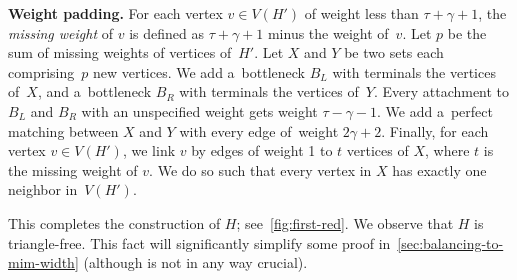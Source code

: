 \documentclass[a4paper,UKenglish,cleveref,hyperref,autoref]{lipics-v2021}
\begin{document}
\medskip

\textbf{Weight padding.}
For each vertex $v \in V(H')$ of weight less than $\tau + \gamma + 1$, the \emph{missing weight} of $v$ is defined as $\tau + \gamma + 1$ minus the weight of~$v$.
Let $p$ be the sum of missing weights of vertices of~$H'$.
Let $X$ and $Y$ be two sets each comprising~$p$ new vertices.
We add a~bottleneck $B_L$ with terminals the vertices of~$X$, and a~bottleneck $B_R$ with terminals the vertices of~$Y$.
Every attachment to $B_L$ and $B_R$ with an unspecified weight gets weight $\tau - \gamma - 1$.
We add a~perfect matching between $X$ and $Y$ with every edge of~weight $2 \gamma + 2$.
Finally, for each vertex $v \in V(H')$, we link $v$ by edges of weight 1 to $t$ vertices of $X$, where $t$ is the missing weight of $v$.
We do so such that every vertex in $X$ has exactly one neighbor in~$V(H')$.

This completes the construction of $H$; see~\cref{fig:first-red}.
We observe that $H$ is triangle-free.
This fact will significantly simplify some proof in~\cref{sec:balancing-to-mim-width} (although is not in any way crucial).
\end{document}
